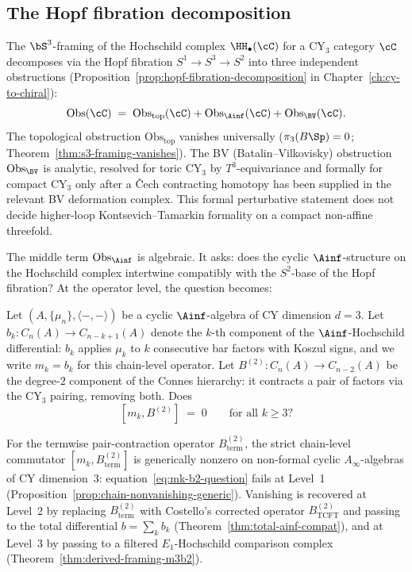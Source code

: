 \subsection{The Hopf fibration decomposition}
\label{subsec:m3b2-hopf}

The $\bS^3$-framing of the Hochschild complex $\HH_\bullet(\cC)$
for a CY$_3$ category $\cC$ decomposes via the Hopf fibration
$S^1 \to S^3 \to S^2$ into three independent obstructions
(Proposition~\ref{prop:hopf-fibration-decomposition} in
Chapter~\ref{ch:cy-to-chiral}):
\begin{equation}
\label{eq:obs-decomposition}
 \mathrm{Obs}(\cC) \;=\; \mathrm{Obs}_{\mathrm{top}}(\cC)
 + \mathrm{Obs}_{\Ainf}(\cC) + \mathrm{Obs}_{\BV}(\cC).
\end{equation}
The topological obstruction $\mathrm{Obs}_{\mathrm{top}}$
vanishes universally ($\pi_3(B\Sp) = 0$; Theorem~\ref{thm:s3-framing-vanishes}).
The BV (Batalin--Vilkovisky) obstruction $\mathrm{Obs}_{\BV}$ is
analytic, resolved for toric CY$_3$ by $T^3$-equivariance and
formally for compact CY$_3$ only after a \v{C}ech contracting homotopy
has been supplied in the relevant BV deformation complex. This
formal perturbative statement does not decide higher-loop
Kontsevich--Tamarkin formality on a compact non-affine threefold.

The middle term $\mathrm{Obs}_{\Ainf}$ is algebraic.
It asks: does the cyclic $\Ainf$-structure on the Hochschild
complex intertwine compatibly with the $S^2$-base of the Hopf
fibration? At the operator level, the question becomes:


\begin{openproblem}
\label{op:mk-b2}
Let $(A, \{\mu_n\}, \langle -,- \rangle)$ be a cyclic
$\Ainf$-algebra of CY dimension $d = 3$. Let
$b_k \colon C_n(A) \to C_{n-k+1}(A)$ denote the $k$-th
component of the $\Ainf$-Hochschild differential: $b_k$
applies $\mu_k$ to $k$ consecutive bar factors with Koszul
signs, and we write $m_k = b_k$ for this chain-level
operator. Let $B^{(2)} \colon C_n(A) \to C_{n-2}(A)$ be the
degree-$2$ component of the Connes hierarchy: it contracts a
pair of factors via the CY$_3$ pairing, removing both. Does
\begin{equation}
\label{eq:mk-b2-question}
 [m_k, B^{(2)}] \;=\; 0 \qquad \text{for all } k \geq 3\text{?}
\end{equation}
\end{openproblem}

For the termwise pair-contraction operator
$B^{(2)}_{\mathrm{term}}$, the strict chain-level commutator
$[m_k, B^{(2)}_{\mathrm{term}}]$ is generically nonzero on non-formal
cyclic $A_\infty$-algebras of CY dimension~$3$:
equation~\eqref{eq:mk-b2-question} fails at Level~1
(Proposition~\ref{prop:chain-nonvanishing-generic}). Vanishing is
recovered at Level~2 by replacing $B^{(2)}_{\mathrm{term}}$ with
Costello's corrected operator $B^{(2)}_{\mathrm{TCFT}}$ and passing
to the total differential $b = \sum_k b_k$
(Theorem~\ref{thm:total-ainf-compat}), and at Level~3 by passing to
a filtered $E_1$-Hochschild comparison complex
(Theorem~\ref{thm:derived-framing-m3b2}).


